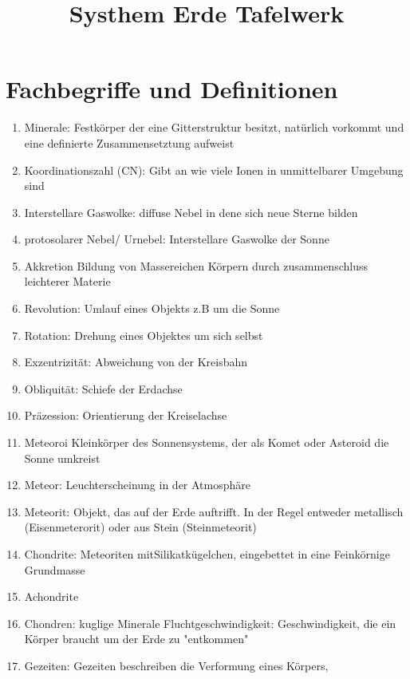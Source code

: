 \documentclass[a4,12pt]{scrartcl}
\begin{document}
\title{Systhem Erde Tafelwerk} \label{sec:Systhem Erde Tafelwerk}
\maketitle




\section{Fachbegriffe und Definitionen} \label{Fachbegriffe und Definitionen}

\begin{enumerate}
\item Minerale: Festkörper der eine Gitterstruktur besitzt, natürlich vorkommt und eine definierte Zusammensetztung aufweist
\item Koordinationszahl (CN): Gibt an wie viele Ionen in unmittelbarer Umgebung sind 
\item Interstellare Gaswolke: diffuse Nebel in dene sich neue Sterne bilden
\item protosolarer Nebel/ Urnebel: Interstellare Gaswolke der Sonne
\item Akkretion Bildung von Massereichen Körpern durch zusammenschluss leichterer Materie
\item Revolution: Umlauf eines Objekts z.B um die Sonne
\item Rotation: Drehung eines Objektes um sich selbst
\item Exzentrizität: Abweichung von der Kreisbahn
\item Obliquität: Schiefe der Erdachse
\item Präzession: Orientierung der Kreiselachse
\item Meteoroi Kleinkörper des Sonnensystems, der als Komet oder Asteroid die Sonne umkreist
\item Meteor: Leuchterscheinung in der Atmosphäre
\item Meteorit: Objekt, das auf der Erde auftrifft. In der Regel entweder metallisch (Eisenmeterorit) oder aus Stein (Steinmeteorit)
\item Chondrite: Meteoriten mitSilikatkügelchen, eingebettet in eine Feinkörnige Grundmasse
\item Achondrite
\item Chondren: kuglige Minerale
Fluchtgeschwindigkeit: Geschwindigkeit, die ein Körper braucht um der Erde zu "entkommen"
\item Gezeiten: Gezeiten beschreiben die Verformung eines Körpers, 

\end{enumerate}
\end{document}
